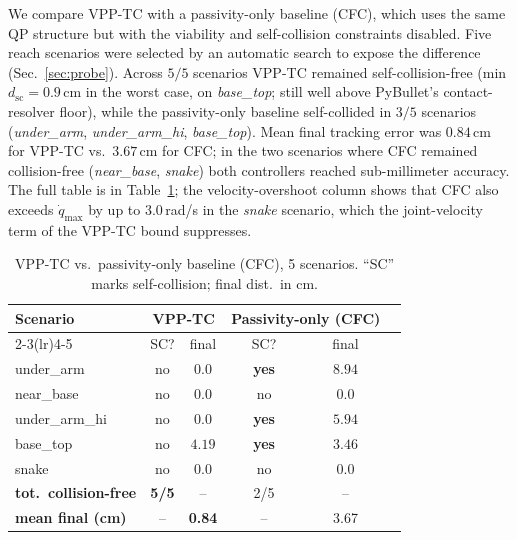 \documentclass[10pt,conference]{IEEEtran}
\theoremstyle{remark}
\theoremstyle{plain}
\begin{document}
We compare VPP-TC with a passivity-only baseline (CFC), which
uses the same QP structure but with the viability and
self-collision constraints disabled. Five reach scenarios were
selected by an automatic search to expose the difference
(Sec.~\ref{sec:probe}).
Across $5/5$ scenarios VPP-TC remained self-collision-free
(min $d_{\text{sc}} = 0.9$\,cm in the worst case, on
\emph{base\_top}; still well above PyBullet's contact-resolver
floor), while the
passivity-only baseline self-collided in $3/5$ scenarios
(\emph{under\_arm}, \emph{under\_arm\_hi}, \emph{base\_top}).
Mean final tracking error was $0.84$\,cm for VPP-TC vs.\
$3.67$\,cm for CFC; in the
two scenarios where CFC remained collision-free
(\emph{near\_base}, \emph{snake}) both controllers reached
sub-millimeter accuracy. The full table is in
Table~\ref{tab:baseline}; the velocity-overshoot column shows
that CFC also exceeds $\dot q_{\max}$ by up to $3.0$\,rad/s in
the \emph{snake} scenario, which the joint-velocity term of the
VPP-TC bound suppresses.

\begin{table}[t]
\centering
\caption{VPP-TC vs.\ passivity-only baseline (CFC), 5 scenarios.
``SC'' marks self-collision; final dist.\ in cm.}
\label{tab:baseline}
\small
\begin{tabular}{@{}lccccc@{}}
\toprule
\multirow{2}{*}{Scenario}
       & \multicolumn{2}{c}{VPP-TC}
       & \multicolumn{2}{c}{Passivity-only (CFC)} \\
\cmidrule(lr){2-3}\cmidrule(lr){4-5}
       & SC? & final & SC? & final \\
\midrule
under\_arm    & no & $0.0$ & \textbf{yes} & $8.94$ \\
near\_base    & no & $0.0$ & no           & $0.0$  \\
under\_arm\_hi& no & $0.0$ & \textbf{yes} & $5.94$ \\
base\_top     & no & $4.19$ & \textbf{yes}& $3.46$ \\
snake         & no & $0.0$ & no           & $0.0$  \\
\midrule
\textbf{tot.\ collision-free}
              & \textbf{5/5} & --
              & 2/5 & -- \\
\textbf{mean final (cm)}
              & --   & \textbf{0.84}
              & --   & 3.67 \\
\bottomrule
\end{tabular}
\end{table}

\end{document}
